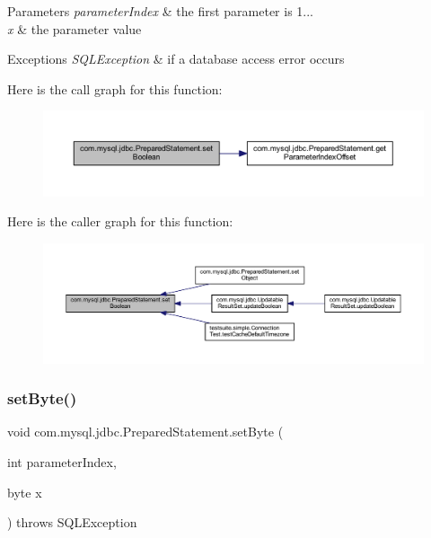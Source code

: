 \begin{DoxyParams}{Parameters}
{\em parameter\+Index} & the first parameter is 1... \\
\hline
{\em x} & the parameter value\\
\hline
\end{DoxyParams}

\begin{DoxyExceptions}{Exceptions}
{\em S\+Q\+L\+Exception} & if a database access error occurs \\
\hline
\end{DoxyExceptions}
Here is the call graph for this function\+:
\nopagebreak
\begin{figure}[H]
\begin{center}
\leavevmode
\includegraphics[width=350pt]{classcom_1_1mysql_1_1jdbc_1_1_prepared_statement_a9f0e5dd8b1cae6d2f116ae694577b2ce_cgraph}
\end{center}
\end{figure}
Here is the caller graph for this function\+:
\nopagebreak
\begin{figure}[H]
\begin{center}
\leavevmode
\includegraphics[width=350pt]{classcom_1_1mysql_1_1jdbc_1_1_prepared_statement_a9f0e5dd8b1cae6d2f116ae694577b2ce_icgraph}
\end{center}
\end{figure}
\mbox{\label{classcom_1_1mysql_1_1jdbc_1_1_prepared_statement_a77b76109f1a5e97036a8a82de590efc5}} 
\subsubsection{\texorpdfstring{set\+Byte()}{setByte()}}
{\footnotesize\ttfamily void com.\+mysql.\+jdbc.\+Prepared\+Statement.\+set\+Byte (\begin{DoxyParamCaption}\item[{int}]{parameter\+Index,  }\item[{byte}]{x }\end{DoxyParamCaption}) throws S\+Q\+L\+Exception}

